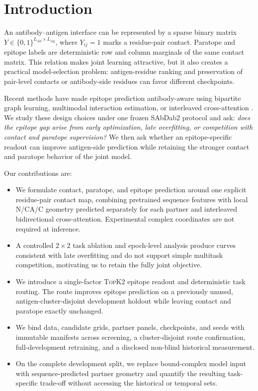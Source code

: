\documentclass[10pt]{article}
\newcommand{\topktwo}{\textsc{TopK2}}
\begin{document}
\section{Introduction}

An antibody--antigen interface can be represented by a sparse binary matrix
$Y\in\{0,1\}^{L_{\mathrm{Ab}}\times L_{\mathrm{Ag}}}$, where $Y_{ij}=1$ marks a
residue-pair contact. Paratope and epitope labels are deterministic row and
column marginals of the same contact matrix. This relation
makes joint learning attractive, but it also creates a practical model-selection
problem: antigen-residue ranking and preservation of pair-level contacts or
antibody-side residues can favor different checkpoints.

Recent methods have made epitope prediction antibody-aware using bipartite graph
learning, multimodal interaction estimation, or interleaved cross-attention
\citep{liu2024asep,wang2024mipe,ahmed2026epiformer}. We study these design
choices under one frozen SAbDab2 protocol and ask: \emph{does the epitope
gap arise from early optimization, late overfitting, or competition with contact
and paratope supervision?} We then ask whether an epitope-specific readout can
improve antigen-side prediction while retaining the stronger contact and
paratope behavior of the joint model.

Our contributions are:
\begin{itemize}
  \item We formulate contact, paratope, and epitope prediction around one explicit
  residue-pair contact map, combining pretrained sequence features with local
  N/CA/C geometry predicted separately for each partner and interleaved
  bidirectional cross-attention. Experimental complex coordinates are not
  required at inference.
  \item A controlled $2\times2$ task ablation and epoch-level analysis produce
  curves consistent with late overfitting and do not support simple multitask
  competition, motivating us to retain the fully joint objective.
  \item We introduce a single-factor \topktwo{} epitope readout and deterministic
  task routing. The route improves epitope prediction on a previously unused,
  antigen-cluster-disjoint development holdout while leaving contact and
  paratope exactly unchanged.
  \item We bind data, candidate grids, partner panels, checkpoints, and seeds
  with immutable manifests across screening, a cluster-disjoint route
  confirmation, full-development retraining, and a disclosed non-blind
  historical measurement.
  \item On the complete development split, we replace bound-complex model input
  with sequence-predicted partner geometry and quantify the resulting
  task-specific trade-off without accessing the historical or temporal sets.
\end{itemize}
\end{document}
